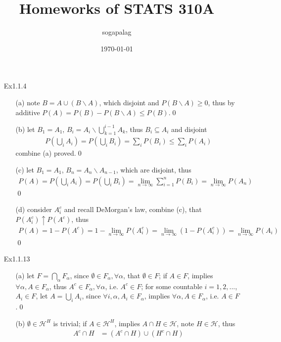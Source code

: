 \documentclass[paper=a4, fontsize=11pt]{scrartcl} %
\title{Homeworks of STATS 310A}
\author{sogapalag}
\date{\normalsize\today}
\numberwithin{equation}{section} %
\numberwithin{figure}{section} %
\numberwithin{table}{section} %
\begin{document}
\maketitle
\begin{itemize}
	\item[Ex1.1.4] 
	\begin{itemize}
		\item[(a)] note $B = A \cup (B\backslash A)$, which disjoint and $P(B\backslash A)\geq 0$, thus by additive $P(A)=P(B)-P(B\backslash A)\leq P(B)$.\qed
		\item[(b)] let $B_1= A_1$, $B_i = A_i\backslash \bigcup_{k=1}^{i-1} A_k$, thus $B_i\subseteq A_i$ and disjoint
		\begin{align}
			P(\bigcup_i A_i)  = P(\bigcup_i B_i) =\sum_i P(B_i) \leq \sum_i P(A_i)
		\end{align}
		combine (a) proved.\qed
		\item[(c)] let $B_1= A_1$, $B_n = A_n\backslash A_{n-1}$, which are disjoint, thus
		\begin{align}
			P(A) = P(\bigcup_i A_i) = P(\bigcup_i B_i) = \lim_{n\rightarrow\infty} \sum_{i=1}^n P(B_i) = \lim_{n\rightarrow \infty} P(A_n)
		\end{align}\qed
		\item[(d)] consider $A_i^c$ and recall DeMorgan's law, combine (c), that $P(A_i^c)\uparrow P(A^c)$, thus
		\begin{align}
			P(A) = 1-P(A^c) = 1 - \lim_{n\rightarrow \infty} P(A_i^c) = \lim_{n\rightarrow \infty} (1 - P(A_i^c)) = \lim_{n\rightarrow \infty}  P(A_i)
		\end{align}\qed
	\end{itemize}
	\item[Ex1.1.13]
	\begin{itemize}
		\item[(a)] let $F = \bigcap_\alpha F_\alpha$, since $\emptyset\in F_{\alpha}, \forall \alpha$, that $\emptyset\in F$; if $A\in F$, implies $\forall \alpha,  A\in F_\alpha$, thus $A^c\in F_\alpha, \forall \alpha$, i.e. $A^c\in F$; for some countable $i=1,2,...$, $A_i\in F$, let $A=\bigcup_i A_i$, since $\forall i,\alpha, A_i\in F_\alpha$, implies $\forall \alpha, A\in F_\alpha$, i.e. $A\in F$.\qed
		\item[(b)] $\emptyset\in \mathcal{H}^H$ is trivial; if $A\in \mathcal{H}^H$, implies $A\cap H\in \mathcal{H}$, note $H\in \mathcal{H}$, thus
		\begin{align}
			A^c \cap H &= (A^c \cap H) \cup (H^c \cap H) \\

\end{align}
\end{itemize}
\end{itemize}
\end{document}
